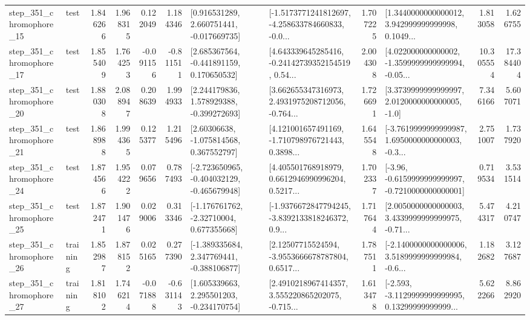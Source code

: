 \begin{tabular}{llrrrrllrlrr}
  step\_351\_chromophore\_15 &      test &      1.846266 &    1.968315 &      0.122049 &  1.184346 &    [0.916531289, 2.660751441, -0.017669735] &  [-1.5173771241812697, -4.258633784660833, -0.0... &       1.707225 &  [1.3440000000000012, 3.942999999999998, 0.1049... &            1.813058 &          1.626755 \\
  step\_351\_chromophore\_17 &      test &      1.855409 &    1.764253 &     -0.091156 & -0.811511 &    [2.685367564, -0.441891159, 0.170650532] &  [4.643339645285416, -0.24142739352154519, 0.54... &       2.004308 &  [4.022000000000002, -1.3599999999999994, -0.05... &           10.305554 &         17.384404 \\
  step\_351\_chromophore\_20 &      test &      1.880308 &    2.088947 &      0.208639 &  1.994933 &    [2.244179836, 1.578929388, -0.399272693] &  [3.662655347316973, 2.4931975208712056, -0.764... &       1.726691 &     [3.3739999999999997, 2.0120000000000005, -1.0] &            7.346166 &          5.607071 \\
  step\_351\_chromophore\_21 &      test &      1.868988 &    1.994365 &      0.125377 &  1.215496 &     [2.60306638, -1.075814568, 0.367552797] &  [4.121001657491169, -1.710798976721443, 0.3898... &       1.645548 &  [-3.7619999999999987, 1.6950000000000003, -0.3... &            2.751007 &          1.737920 \\
  step\_351\_chromophore\_24 &      test &      1.874566 &    1.954222 &      0.079656 &  0.787493 &  [-2.723650965, -0.404032129, -0.465679948] &  [4.405501768918979, 0.6612946990996204, 0.5217... &       1.702337 &  [-3.96, -0.6159999999999997, -0.7210000000000001] &            0.719534 &          3.531514 \\
  step\_351\_chromophore\_25 &      test &      1.872471 &    1.901476 &      0.029006 &  0.313346 &    [-1.176761762, -2.32710004, 0.677355668] &  [-1.9376672847794245, -3.8392133818246372, 0.9... &       1.717644 &  [2.0050000000000003, 3.4339999999999975, -0.71... &            5.474317 &          4.210747 \\
  step\_351\_chromophore\_26 &  training &      1.852987 &    1.878152 &      0.025165 &  0.277390 &   [-1.389335684, 2.347769441, -0.388106877] &  [2.12507715524594, -3.9553666678787804, 0.6517... &       1.787511 &  [-2.1400000000000006, 3.5189999999999984, -0.6... &            1.182682 &          3.127687 \\
  step\_351\_chromophore\_27 &  training &      1.818102 &    1.746214 &     -0.071888 & -0.631143 &    [1.605339663, 2.295501203, -0.234170754] &  [2.4910218967414357, 3.555220865202075, -0.715... &       1.613478 &  [-2.593, -3.1129999999999995, 0.13299999999999... &            5.622266 &          8.862920 \\

\end{tabular}
